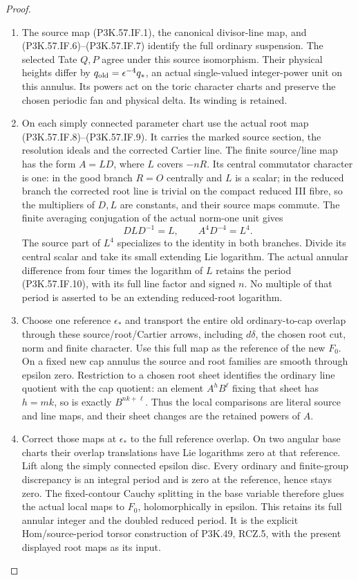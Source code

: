 \begin{proof}
\begin{enumerate}[label=\arabic*.]
\item The source map (P3K.57.IF.1), the canonical divisor-line map,
and (P3K.57.IF.6)--\allowbreak (P3K.57.IF.7) identify the full ordinary suspension.
The selected Tate \(Q,P\) agree under this source
isomorphism. Their physical heights differ by
\(q_{\rm old}=\epsilon^{-4}q_*\), an actual single-valued
integer-power unit on this annulus. Its powers act on
the toric character charts and preserve the chosen
periodic fan and physical delta. Its winding is retained.

\item On each simply connected parameter chart use the actual
root map (P3K.57.IF.8)--\allowbreak (P3K.57.IF.9). It carries the marked source
section, the resolution ideals and the corrected Cartier
line. The finite source/line map has the form \(A=LD\),
where \(L\) covers \(-nR\). Its central commutator
character is one: in the good branch \(R=O\) centrally
and \(L\) is a scalar; in the reduced branch the
corrected root line is trivial on the compact reduced
III fibre, so the multipliers of \(D,L\) are constants,
and their source maps commute. The finite averaging
conjugation of the actual norm-one unit gives
\[
 DLD^{-1}=L,\qquad A^4D^{-4}=L^4 .
\]
The source part of \(L^4\) specializes to the identity
in both branches. Divide its central scalar and take
its small extending Lie logarithm. The actual annular
difference from four times the logarithm of \(L\)
retains the period (P3K.57.IF.10), with its full line factor
and signed \(n\). No multiple of that period is
asserted to be an extending reduced-root logarithm.

\item Choose one reference \(\epsilon_*\) and transport the
entire old ordinary-to-cap overlap through these
source/root/Cartier arrows, including \(d\delta\),
the chosen root cut, norm and finite character.
Use this full map as the reference of the new
\(F_0\). On a fixed new cap annulus the source and
root families are smooth through epsilon zero.
Restriction to a chosen root sheet identifies
the ordinary line quotient with the cap quotient:
an element \(A^hB^\ell\) fixing that sheet has
\(h=mk\), so is exactly \(B^{nk+\ell}\).
Thus the local comparisons are literal source
and line maps, and their sheet changes are the
retained powers of \(A\).

\item Correct those maps at \(\epsilon_*\) to the full
reference overlap. On two angular base charts
their overlap translations have Lie logarithms
zero at that reference. Lift along the simply
connected epsilon disc. Every ordinary and
finite-group discrepancy is an integral period
and is zero at the reference, hence stays zero.
The fixed-contour Cauchy splitting in the base
variable therefore glues the actual local maps
to \(F_0\), holomorphically in epsilon. This
retains its full annular integer and the
doubled reduced period. It is the explicit
Hom/source-period torsor construction of
P3K.49, RCZ.5, with the present displayed root maps
as its input.


\end{enumerate}
\end{proof}
